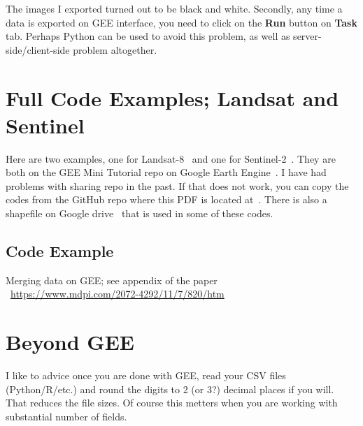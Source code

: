 \documentclass{article}
\begin{document}
\begin{description}
The images I exported turned out to be black and white.
Secondly, any time a data is exported on GEE interface, you need
to click on the \textbf{Run} button on \textbf{Task} tab. Perhaps Python
can be used to avoid this problem, as well as server-side/client-side
problem altogether.

\end{description}


\section{Full Code Examples; Landsat and Sentinel}

Here are two examples, one for Landsat-8~\cite{FullCodeLandsat8} 
and one for Sentinel-2~\cite{FullCodeSentinel}.
They are both on the GEE Mini Tutorial repo on 
Google Earth Engine~\cite{GEEMiniTutorialRepoonEE}. 
I have had problems with sharing repo in the past.
If that does not work, you can copy the codes
from the GitHub repo where this PDF is located
at~\cite{MiniTutorialOnGitHub}.
There is also a shapefile on Google drive~\cite{ShapeFileOnDrive} that is used
in some of these codes.

\subsection{Code Example}
Merging data on GEE; see appendix of the paper\\
~\href{https://www.mdpi.com/2072-4292/11/7/820/htm}{https://www.mdpi.com/2072-4292/11/7/820/htm}

\section{Beyond GEE}
I like to advice once you are done with GEE,
read your CSV files (Python/R/etc.) and round the 
digits to 2 (or 3?) decimal places
if you will. That reduces the file sizes.
Of course this metters when you are working
with substantial number of fields.





\end{document}
